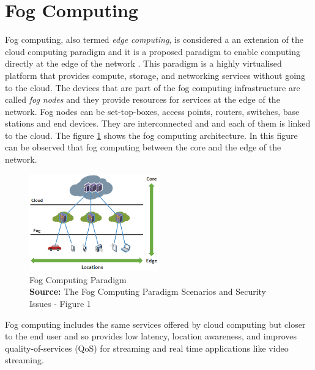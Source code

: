 \section{Fog Computing}
Fog computing, also termed \emph{edge computing}, is considered a an extension of the cloud computing paradigm and it is a proposed paradigm to enable computing directly at the edge of the network \cite{fog}. This paradigm is a highly virtualised platform that provides compute, storage, and networking services without going to the cloud. The devices that are part of the fog computing infrastructure are called \emph{fog nodes} and they provide resources for services at the edge of the network. Fog nodes can be set-top-boxes, access points, routers, switches, base stations and end devices. They are interconnected and and each of them
is linked to the cloud. The figure \ref{fog} shows the fog computing architecture. In this figure can be observed that fog computing between the core and the edge of the network.

\begin{figure}[!h]
\centering
\includegraphics[width=0.5\textwidth]{images/fog}
\caption[Fog Computing Paradigm]{Fog Computing Paradigm \\
\scriptsize{\textbf{Source:} The Fog Computing Paradigm Scenarios and Security Issues - Figure 1}}
\label{fog}
\end{figure}

Fog computing includes the same services offered by cloud computing but closer to the end user and so provides low latency, location awareness, and improves quality-of-services (QoS) for streaming and real time applications like video streaming.

